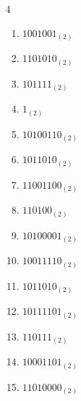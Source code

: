 \begin{multicols}{4}
\begin{enumerate}
        \phantom{$=73$}

  \item $1001001_{(2)}$

        \phantom{$=73$}

\columnbreak %

\resetques

  \item $1101010_{(2)}$

        \phantom{$=106$}

  \item $101111_{(2)}$

        \phantom{$=47$}

  \item $1_{(2)}$

        \phantom{$=1$}

  \item $10100110_{(2)}$

        \phantom{$=166$}

  \item $1011010_{(2)}$

        \phantom{$=90$}

  \item $11001100_{(2)}$

        \phantom{$=204$}

  \item $110100_{(2)}$

        \phantom{$=52$}

  \item $10100001_{(2)}$

        \phantom{$=161$}

  \item $10011110_{(2)}$

        \phantom{$=158$}

  \item $1011010_{(2)}$

        \phantom{$=90$}

  \item $10111101_{(2)}$

        \phantom{$=189$}

  \item $110111_{(2)}$

        \phantom{$=55$}

  \item $10001101_{(2)}$

        \phantom{$=141$}

  \item $11010000_{(2)}$


\end{enumerate}
\end{multicols}
